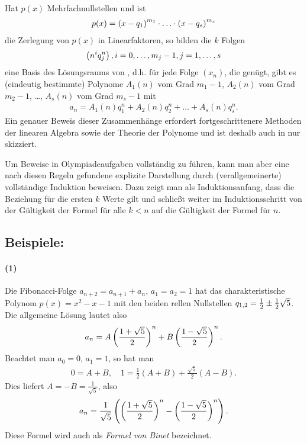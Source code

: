 \documentclass[11pt,a4paper]{article}
\begin{document}
Hat $p(x)$ Mehrfachnullstellen und ist
\begin{gather*}
  p(x)=\br{x-q_1}^{m_1}\m \dots \m \br{x-q_s}^{m_s}
\end{gather*}
die Zerlegung von $p(x)$ in Linearfaktoren, so bilden die $k$ Folgen
\begin{gather*}
  \left(n^iq_j^n\right), i=0,\dots, m_j-1, j=1,\dots,s
\end{gather*}
eine Basis des Lösungsraums von \rf[e-linrek], d.h. für jede Folge $(x_n)$,
die \rf[e-linrek] genügt, gibt es (eindeutig bestimmte) Polynome $A_1(n)$
vom Grad $m_1-1$, $A_2(n)$ vom Grad $m_2-1$, \dots, $A_s(n)$ vom Grad $m_s-1$
mit
\begin{gather*}
  a_n=A_1(n)q_1^n+A_2(n)q_2^n+\dots+A_s(n)q_s^n.
\end{gather*}
Ein genauer Beweis dieser Zusammenhänge erfordert fortgeschrittenere Methoden
der linearen Algebra sowie der Theorie der Polynome und ist deshalb auch in
\cite{b-schueler} nur skizziert. 

Um Beweise in Olympiadeaufgaben vollständig zu führen, kann man aber eine nach
diesen Regeln gefundene explizite Darstellung durch (verallgemeinerte)
vollständige Induktion beweisen. Dazu zeigt man als Induktionsanfang, dass die
Beziehung für die ersten $k$ Werte gilt und schließt weiter im
Induktionsschritt von der Gültigkeit der Formel für alle $k<n$ auf die
Gültigkeit der Formel für $n$.

\subsection*{Beispiele:}

\paragraph{(1)}
Die Fibonacci-Folge $a_{n+2}=a_{n+1} +a_n$, $a_1=a_2=1$ hat das
charakteristische Polynom $p(x)=x^2-x-1$ mit den beiden rellen Nullstellen
$q_{1,2} =\frac{1}{2} \pm \frac{1}{2} \sqrt{5}$. Die allgemeine Lösung lautet also
\begin{gather*}
a_n=A \left(\frac{1+\sqrt{5}}{2}\right)^n +B \left(\frac{1-\sqrt{5}}{2}\right)^n.
\end{gather*}
Beachtet man $a_0=0$, $a_1=1$, so hat man
\begin{gather*}
0=A+B,\quad 1=\frac12(A+B) +\frac{\sqrt{5}}{2}(A-B).
\end{gather*}
Dies liefert $A=-B=\frac{1}{\sqrt{5}}$, also
\begin{gather*}
  a_n=\frac{1}{\sqrt{5}}\left(\left(\frac{1+\sqrt{5}}{2}\right)^n
    -\left(\frac{1-\sqrt{5}}{2}\right)^n\right).
\end{gather*}
Diese Formel wird auch als \emph{Formel von Binet} bezeichnet. 
\end{document}

